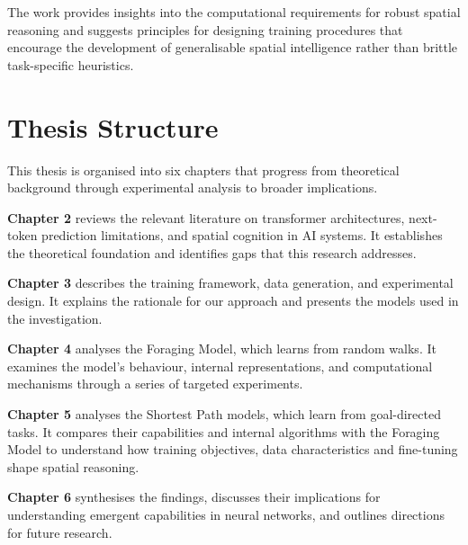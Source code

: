 The work provides insights into the computational requirements for robust spatial reasoning and suggests principles for designing training procedures that encourage the development of generalisable spatial intelligence rather than brittle task-specific heuristics.

\section{Thesis Structure}

This thesis is organised into six chapters that progress from theoretical background through experimental analysis to broader implications.

\textbf{Chapter 2} reviews the relevant literature on transformer architectures, next-token prediction limitations, and spatial cognition in AI systems. It establishes the theoretical foundation and identifies gaps that this research addresses.

\textbf{Chapter 3} describes the training framework, data generation, and experimental design. It explains the rationale for our approach and presents the models used in the investigation.

\textbf{Chapter 4} analyses the Foraging Model, which learns from random walks. It examines the model's behaviour, internal representations, and computational mechanisms through a series of targeted experiments.

\textbf{Chapter 5} analyses the Shortest Path models, which learn from goal-directed tasks. It compares their capabilities and internal algorithms with the Foraging Model to understand how training objectives, data characteristics and fine-tuning shape spatial reasoning.

\textbf{Chapter 6} synthesises the findings, discusses their implications for understanding emergent capabilities in neural networks, and outlines directions for future research.

